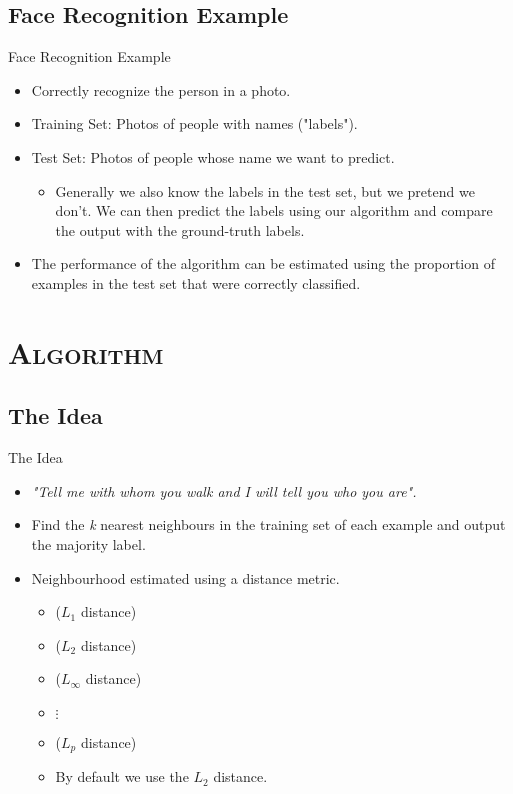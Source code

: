 \subsection{Face Recognition Example}
\begin{frame}{Face Recognition Example}
	\begin{itemize}
		\item Correctly recognize the person in a photo.
		\item Training Set: Photos of people with names ("labels").
		\item Test Set: Photos of people whose name we want to predict.
		\begin{itemize}
			\item Generally we also know the labels in the test set, but we pretend we don't. We can then predict the labels using our algorithm and compare the output with the ground-truth labels.
		\end{itemize}
		\item The performance of the algorithm can be estimated using the proportion of examples in the test set that were correctly classified.
	\end{itemize}
\end{frame}


\section{\scshape Algorithm}
\subsection{The Idea}
\begin{frame}{The Idea}
	\begin{itemize}
		\item \textit{"Tell me with whom you walk and I will tell you who you are".}
		\item Find the \textit{k} nearest neighbours in the training set of each example and output the majority label.
		\item Neighbourhood estimated using a distance metric.
		\begin{itemize}
			\item {} ($L_1$ distance)
			\item {} ($L_2$ distance)
			\item {} ($L_\infty$ distance)
			\item $\vdots$
			\item {} ($L_p$ distance)
			\item By default we use the $L_2$ distance.
		\end{itemize}
	\end{itemize}
\end{frame}


